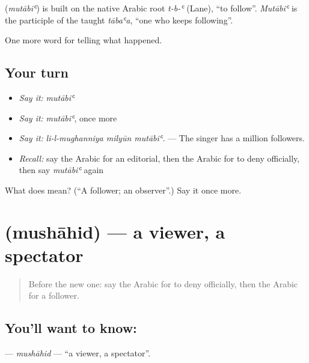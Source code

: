 \begin{cousinweb}
\textbf{} (\emph{mutābiʿ}) is built on the native Arabic root \emph{t-b-ʿ} (Lane), \textquotedblleft{}to follow\textquotedblright{}. \emph{Mutābiʿ} is the participle of the taught \emph{tābaʿa}, \textquotedblleft{}one who keeps following\textquotedblright{}.
\end{cousinweb}

\begin{grammarlens}[title={What you've built}]
One more word for telling what happened.
\end{grammarlens}

\subsection*{Your turn}
\begin{itemize}
\raggedright
  \item \emph{Say it:} \emph{mutābiʿ}
  \item \emph{Say it:} \emph{mutābiʿ}, once more
  \item \emph{Say it:} \emph{li-l-mughanniya milyūn mutābiʿ.} — The singer has a million followers.
  \item \emph{Recall:} say the Arabic for an editorial, then the Arabic for to deny officially, then say \emph{mutābiʿ} again
\end{itemize}

\begin{tcolorbox}[breakable,colback=teal!4,colframe=teal!35!black,title={Before you move on}]
What does  mean? (\textquotedblleft{}A follower; an observer\textquotedblright{}.) Say it once more.
\end{tcolorbox}
\section[\texorpdfstring{\ar{مشاهد} (mushāhid)}{مشاهد (mushāhid)}]{ (mushāhid) — a viewer, a spectator}

\label{lesson:AR-C356-mushahid}



\begin{quote}
Before the new one: say the Arabic for to deny officially, then the Arabic for a follower.
\end{quote}

\subsection*{You'll want to know: }
\textbf{} — \emph{mushāhid} — \textquotedblleft{}a viewer, a spectator\textquotedblright{}.

